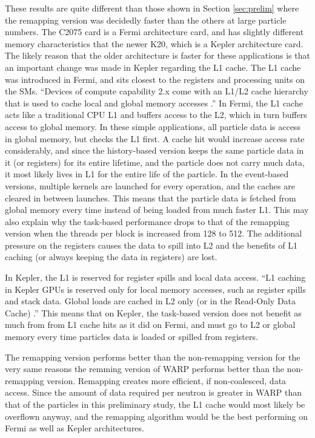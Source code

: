 These results are quite different than those shown in Section \ref{sec:prelim} where the remapping version was decidedly faster than the others at large particle numbers.  The C2075 card is a Fermi architecture card, and has slightly different memory characteristics that the newer K20, which is a Kepler architecture card.  The likely reason that the older architecture is faster for these applications is that an important change was made in Kepler regarding the L1 cache.  The L1 cache was introduced in Fermi, and sits closest to the registers and processing units on the SMs.  ``Devices of compute capability 2.x come with an L1/L2 cache hierarchy that is used to cache local and global memory accesses \cite{fermi}.''    In Fermi, the L1 cache acts like a traditional CPU L1 and buffers access to the L2, which in turn buffers access to global memory.  In these simple applications, all particle data is access in global memory, but checks the L1 first.  A cache hit would increase access rate considerably, and since the history-based version keeps the same particle data in it (or registers) for its entire lifetime, and the particle does not carry much data, it most likely lives in L1 for the entire life of the particle.  In the event-based versions, multiple kernels are launched for every operation, and the caches are cleared in between launches.  This means that the particle data is fetched from global memory every time instead of being loaded from much faster L1.  This may also explain why the task-based performance drops to that of the remapping version when the threads per block is increased from 128 to 512.  The additional pressure on the registers causes the data to spill into L2 and the benefits of L1 caching (or always keeping the data in registers) are lost.

In Kepler, the L1 is reserved for register spills and local data access.  ``L1 caching in Kepler GPUs is reserved only for local memory accesses, such as register spills and stack data. Global loads are cached in L2 only (or in the Read-Only Data Cache) \cite{kepler}.''  This means that on Kepler, the task-based version does not benefit as much from from L1 cache hits as it did on Fermi, and must go to L2 or global memory every time particles data is loaded or spilled from registers.

The remapping version performs better than the non-remapping version for the very same reasons the remming version of WARP performs better than the non-remapping version.  Remapping creates more efficient, if non-coalesced, data access.  Since the amount of data required per neutron is greater in WARP than that of the particles in this preliminary study, the L1 cache would most likely be overflown anyway, and the remapping algorithm would be the best performing on Fermi as well as Kepler architectures.

